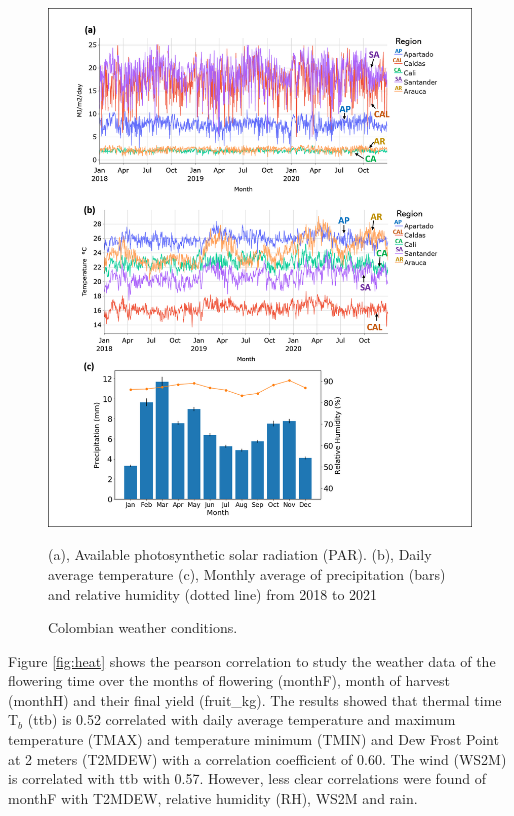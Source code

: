\documentclass[gene,journal,article,submit,moreauthors,pdftex]{Definitions/mdpi}
\begin{document}
\begin{figure}[h!]
	\centering
	\includegraphics[scale=0.4]{images/clima.png}
	\caption{\footnotesize {Colombian weather conditions. \\}}	
	\label{fig:temp}
	{\footnotesize (a), Available photosynthetic solar radiation (PAR). (b), Daily average temperature  (c), Monthly average of precipitation (bars) and relative humidity (dotted line) from 2018 to 2021 }
\end{figure}
\newpage



Figure \ref{fig:heat} shows the pearson correlation to study the weather data of the flowering time over the months of flowering  (monthF), month of harvest (monthH) and their final yield (fruit\_kg). The results showed that thermal time  T$_{b}$ (ttb) is 0.52 correlated with daily average temperature and  maximum temperature (TMAX)  and  temperature minimum (TMIN) and Dew Frost Point at 2 meters (T2MDEW) with  a correlation coefficient of 0.60. The wind (WS2M) is correlated with ttb with 0.57. However, less clear correlations were found of monthF  with T2MDEW, relative humidity (RH), WS2M and rain.  
\end{document}
